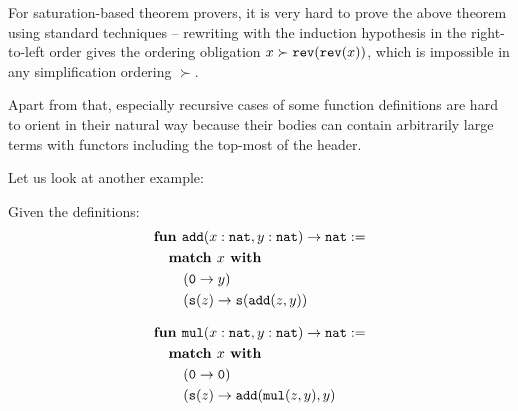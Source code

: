 For saturation-based theorem provers, it is very hard to prove the above theorem using standard techniques -- rewriting with the induction hypothesis in the right-to-left order gives the ordering obligation $x \succ \mathtt{rev}(\mathtt{rev}(x))$, which is impossible in any simplification ordering $\succ$.

Apart from that, especially recursive cases of some function definitions are hard to orient in their natural way because their bodies can contain arbitrarily large terms with functors including the top-most of the header.

Let us look at another example:
\begin{example}\label{ex:2}
	Given the definitions:
	\begin{equation}
	\begin{aligned}
	\nonumber
	&\textbf{fun } \add (x : \nat, y : \nat) \rightarrow \nat :=\\
	&\tab\textbf{match } x \textbf{ with}\\
	&\tab\tab(\zero\rightarrow y)\\ &\tab\tab(\suc(z)\rightarrow\suc(\add(z,y))\end{aligned}\end{equation}
	
	\dotfill
	\begin{equation}
	\begin{aligned}
	\nonumber
	&\textbf{fun } \mul (x : \nat, y : \nat) \rightarrow \nat :=\\
	&\tab\textbf{match } x \textbf{ with}\\
	&\tab\tab(\zero\rightarrow \zero)\\ &\tab\tab(\suc(z)\rightarrow \add(\mul(z,y),y)\end{aligned}\end{equation}
	

\end{example}
